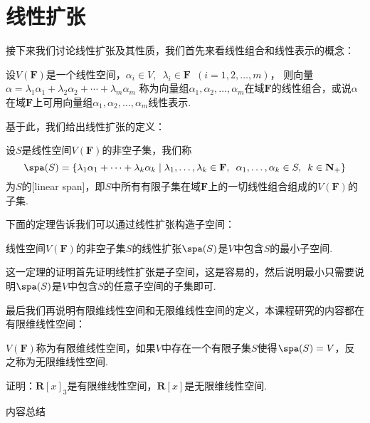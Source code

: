 \section{线性扩张}
接下来我们讨论线性扩张及其性质，我们首先来看线性组合和线性表示的概念：
\begin{definition}
    设$V(\mathbf{F})$是一个线性空间，$\alpha_i\in V,\enspace\lambda_i\in \mathbf{F}\enspace(i=1,2,\ldots,m)$，
    则向量$\alpha=\lambda_1\alpha_1+\lambda_2\alpha_2+\cdots+\lambda_m\alpha_m$
    称为向量组$\alpha_1,\alpha_2,\ldots,\alpha_m$在域$\mathbf{F}$的线性组合，或说$\alpha$
    在域$\mathbf{F}$上可用向量组$\alpha_1,\alpha_2,\ldots,\alpha_m$线性表示.
\end{definition}
基于此，我们给出线性扩张的定义：
\begin{definition}
    设$S$是线性空间$V(\mathbf{F})$的非空子集，我们称
    \[ \spa(S)=\{\lambda_1\alpha_1+\cdots+\lambda_k\alpha_k \mid \lambda_1,\ldots,\lambda_k\in\mathbf{F},\enspace\alpha_1,\ldots,\alpha_k\in S,\enspace k\in\mathbf{N_+}\} \]
    为$S$的[linear span]，即$S$中所有有限子集在域$\mathbf{F}$上的一切线性组合组成的$V(\mathbf{F})$的子集.
\end{definition}
下面的定理告诉我们可以通过线性扩张构造子空间：
\begin{theorem}
    线性空间$V(\mathbf{F})$的非空子集$S$的线性扩张$\spa(S)$是$V$中包含$S$的最小子空间.
\end{theorem}
这一定理的证明首先证明线性扩张是子空间，这是容易的，然后说明最小只需要说明$\spa(S)$是$V$中包含$S$的任意子空间的子集即可.

最后我们再说明有限维线性空间和无限维线性空间的定义，本课程研究的内容都在有限维线性空间：
\begin{definition}
    $V(\mathbf{F})$称为有限维线性空间，如果$V$中存在一个有限子集$S$使得$\spa(S)=V$，反之称为无限维线性空间.
\end{definition}
\begin{example}
    证明：$\mathbf{R}[x]_3$是有限维线性空间，$\mathbf{R}[x]$是无限维线性空间.
\end{example}

\vspace{2ex}
\centerline{\heiti \Large 内容总结}

\vspace{2ex}

